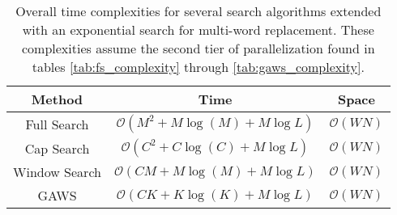 \begin{table}
\centering
\begin{tabular}{ |c|c|c| } 
 \hline
 Method & Time & Space \\ \hline
 Full Search & $\mathcal{O}(M^2 + M\log(M) + M\log L)$ & $\mathcal{O}(WN)$ \\ \hline 
 Cap Search & $\mathcal{O}(C^2 + C\log(C) + M\log L)$ & $\mathcal{O}(WN)$ \\ \hline 
 Window Search & $\mathcal{O}(CM + M\log(M) + M\log L)$ & $\mathcal{O}(WN)$ \\ \hline 
 GAWS & $\mathcal{O}(CK + K\log(K) + M\log L)$ & $\mathcal{O}(WN)$ \\ \hline 
\end{tabular}
\caption{Overall time complexities for several search algorithms extended with an exponential search for multi-word replacement.  These complexities assume the second tier of parallelization found in tables \ref{tab:fs_complexity} through \ref{tab:gaws_complexity}.}
\label{tab:overall_complexity}
\end{table}
